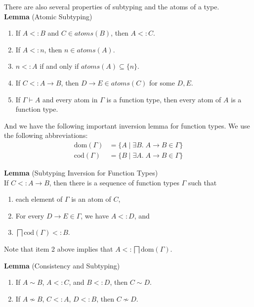 \documentclass{article}
\newcommand{\ATOMS}[1]{\mathit{atoms}(#1)}
\newcommand{\sqinter}[0]{\bigsqcap}
\begin{document}
There are also several properties of subtyping and the atoms of a type.\\

\noindent \textbf{Lemma} (Atomic Subtyping)
\begin{enumerate}
\item If $A <: B$ and $C \in \ATOMS{B}$, then $A <: C$.
\item If $A <: n$, then $n \in \ATOMS{A}$.
\item $n <: A$ if and only if $\ATOMS{A} \subseteq \{ n \}$.
\item If $C <: A \to B$, then $D\to E \in \ATOMS{C}$ for some $D,E$.
\item If $\Gamma \vdash A$ and every atom in $\Gamma$ is a function type,
  then every atom of $A$ is a function type.
\end{enumerate}

And we have the following important inversion lemma for function
types. We use the following abbreviations:
\begin{align*}
  \mathrm{dom}(\Gamma) &= \{ A \mid \exists B.\; A \to B \in \Gamma \}\\
  \mathrm{cod}(\Gamma) &= \{ B \mid \exists A.\; A \to B \in \Gamma \}
\end{align*}

\noindent \textbf{Lemma} (Subtyping Inversion for Function Types)\\
%
If $C <: A \to B$, then there is a sequence of function types $\Gamma$
such that
\begin{enumerate}
\item each element of $\Gamma$ is an atom of $C$,
\item For every $D\to E \in \Gamma$, we have $A <: D$, and
\item $\sqinter \mathrm{cod}(\Gamma) <: B$.
\end{enumerate}
Note that item 2 above implies that $A <: \sqinter \mathrm{dom}(\Gamma)$.

\noindent \textbf{Lemma} (Consistency and Subtyping)
\begin{enumerate}
\item  If $A \sim B$, $A <: C$, and $B <: D$,
  then $C \sim D$.
\item If $A \not\sim B$, $C <: A$, $D <: B$, then $C \not\sim D$.
\end{enumerate}
\end{document}

